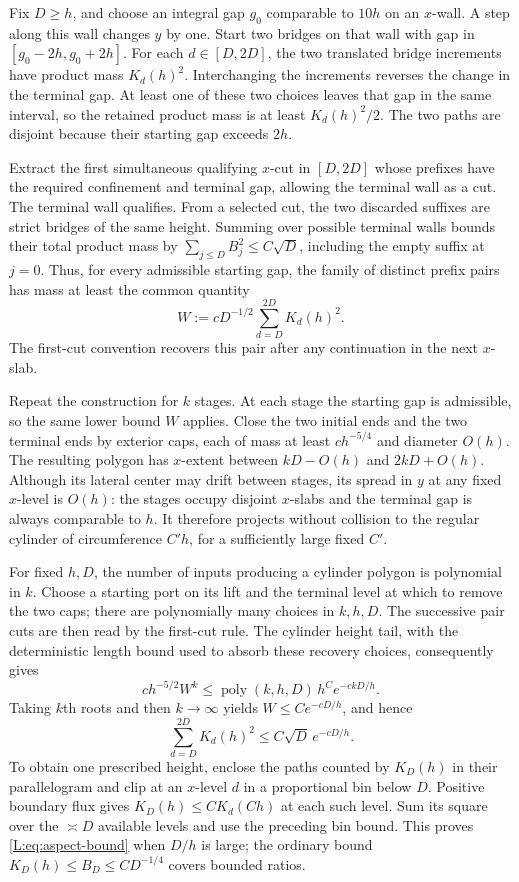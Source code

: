 \documentclass[11pt]{article}
\numberwithin{equation}{section}
\theoremstyle{definition}\newtheorem{definition}[theorem]{Definition}
\theoremstyle{remark}\newtheorem{remark}[theorem]{Remark}
\begin{document}
Fix $D\ge h$, and choose an integral gap $g_0$ comparable to $10h$
on an $x$-wall.  A step along this wall changes $y$ by one.  Start two
bridges on that wall with gap in $[g_0-2h,g_0+2h]$.  For each
$d\in[D,2D]$, the two translated bridge increments have product mass
$K_d(h)^2$.  Interchanging the increments reverses the change in the
terminal gap.  At least one of these two choices leaves that gap in
the same interval, so the retained product mass is at least
$K_d(h)^2/2$.  The two paths are disjoint because their starting gap
exceeds $2h$.

Extract the first simultaneous qualifying $x$-cut in $[D,2D]$
whose prefixes have the required confinement and terminal gap, allowing
the terminal wall as a cut.  The terminal wall qualifies.  From a selected cut, the two discarded
suffixes are strict bridges of the same height.  Summing over possible
terminal walls bounds their total product mass by
$\sum_{j\le D}B_j^2\le C\sqrt D$, including the empty suffix at $j=0$.
Thus, for every admissible starting gap, the family of distinct
prefix pairs has mass at least the common quantity
\[
 W:=cD^{-1/2}\sum_{d=D}^{2D}K_d(h)^2.
\]
The first-cut convention recovers this pair after any continuation in
the next $x$-slab.

Repeat the construction for $k$ stages.  At each stage the starting
gap is admissible, so the same lower bound $W$ applies.  Close the two
initial ends and the two terminal ends by exterior caps, each of
mass at least $ch^{-5/4}$ and diameter $O(h)$.  The resulting polygon
has $x$-extent between $kD-O(h)$ and $2kD+O(h)$.  Although its lateral
center may drift between stages, its spread in $y$ at any fixed
$x$-level is $O(h)$: the stages occupy disjoint $x$-slabs and the
terminal gap is always comparable to $h$.  It therefore projects
without collision to the regular cylinder of circumference $C'h$,
for a sufficiently large fixed $C'$.

For fixed $h,D$, the number of inputs producing a cylinder polygon is
polynomial in $k$.  Choose a starting port on its lift and the terminal
level at which to remove the two caps; there are polynomially many
choices in $k,h,D$.  The successive pair cuts are then read by the
first-cut rule.  The cylinder height tail, with the deterministic
length bound used to absorb these recovery choices, consequently gives
\[
 c h^{-5/2}W^k
 \le \operatorname{poly}(k,h,D)\,h^C e^{-ckD/h}.
\]
Taking $k$th roots and then $k\to\infty$ yields $W\le C e^{-cD/h}$,
and hence
\[
 \sum_{d=D}^{2D}K_d(h)^2\le C\sqrt D\,e^{-cD/h}.
\]
To obtain one prescribed height, enclose the paths counted by $K_D(h)$
in their parallelogram and clip at an $x$-level $d$ in a proportional
bin below $D$.  Positive boundary flux gives
$K_D(h)\le C K_d(Ch)$ at each such level.  Sum its square over the
$\asymp D$ available levels and use the preceding bin bound.  This
proves \eqref{L:eq:aspect-bound} when $D/h$ is large; the ordinary
bound $K_D(h)\le B_D\le CD^{-1/4}$ covers bounded ratios.
\end{document}
